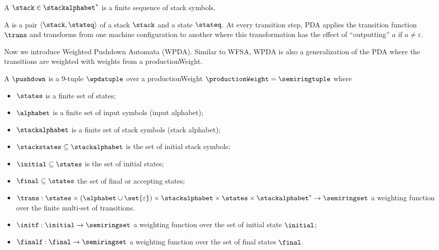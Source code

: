\begin{definition}
A  $\stack \in \stackalphabet^*$ is a finite sequence of stack symbols.
\end{definition}

\begin{definition}
A  is a pair $\langle \stack, \stateq \rangle$ of a stack $\stack$ and a state $\stateq$.
At every transition step, PDA applies the transition function $\trans$ and transforms from one machine configuration to another where this transformation has the effect of ``outputting'' $a$ if $a \neq \varepsilon$.
\end{definition}


Now we introduce Weighted Pushdown Automata (WPDA). Similar to WFSA, WPDA is also a generalization of the PDA where the transitions are weighted with weights from a productionWeight. 

\begin{definition}
A  $\pushdown$ is a 9-tuple $\wpdatuple$ over a productionWeight $\productionWeight=\semiringtuple$ where
\begin{itemize}
    \item $\states$ is a finite set of states;
    \item $\alphabet$ is a finite set of input symbols (input alphabet);
    \item $\stackalphabet$ is a finite set of stack symbols (stack alphabet);
    \item $\stackstates \subseteq \stackalphabet$ is the set of initial stack symbols;
    \item $\initial \subseteq \states$ is the set of initial states; 
    \item $\final \subseteq \states$ the set of final or accepting states;
    \item $\trans: \states \times \left( \alphabet \cup  \set{\varepsilon} \right) \times \stackalphabet \times \states \times \stackalphabet^* \rightarrow \semiringset$ a weighting function over the finite multi-set of transitions.
    \item $\initf : \initial \rightarrow \semiringset$ a weighting function over the set of initial state $\initial$;
    \item $\finalf : \final \rightarrow \semiringset$ a weighting function over the set of final states $\final$.
\end{itemize}
\end{definition}

